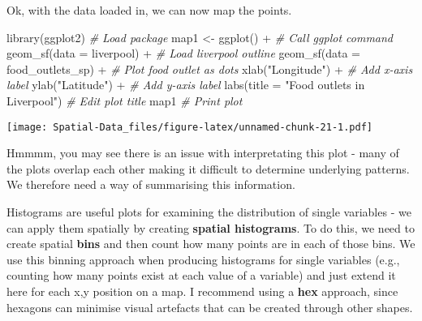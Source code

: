 \documentclass[
]{book}
\newenvironment{Shaded}{\begin{snugshade}}{\end{snugshade}}
\newcommand{\AttributeTok}[1]{\textcolor[rgb]{0.77,0.63,0.00}{#1}}
\newcommand{\CommentTok}[1]{\textcolor[rgb]{0.56,0.35,0.01}{\textit{#1}}}
\newcommand{\FunctionTok}[1]{\textcolor[rgb]{0.00,0.00,0.00}{#1}}
\newcommand{\NormalTok}[1]{#1}
\newcommand{\OtherTok}[1]{\textcolor[rgb]{0.56,0.35,0.01}{#1}}
\newcommand{\SpecialCharTok}[1]{\textcolor[rgb]{0.00,0.00,0.00}{#1}}
\newcommand{\StringTok}[1]{\textcolor[rgb]{0.31,0.60,0.02}{#1}}
\begin{document}
Ok, with the data loaded in, we can now map the points.

\begin{Shaded}
\begin{Highlighting}[]
\FunctionTok{library}\NormalTok{(ggplot2) }\CommentTok{\# Load package}
\NormalTok{map1 }\OtherTok{\textless{}{-}} \FunctionTok{ggplot}\NormalTok{() }\SpecialCharTok{+} \CommentTok{\# Call ggplot command}
  \FunctionTok{geom\_sf}\NormalTok{(}\AttributeTok{data =}\NormalTok{ liverpool) }\SpecialCharTok{+} \CommentTok{\# Load liverpool outline}
  \FunctionTok{geom\_sf}\NormalTok{(}\AttributeTok{data =}\NormalTok{ food\_outlets\_sp) }\SpecialCharTok{+} \CommentTok{\# Plot food outlet as dots}
  \FunctionTok{xlab}\NormalTok{(}\StringTok{"Longitude"}\NormalTok{) }\SpecialCharTok{+} \CommentTok{\# Add x{-}axis label}
  \FunctionTok{ylab}\NormalTok{(}\StringTok{"Latitude"}\NormalTok{) }\SpecialCharTok{+} \CommentTok{\# Add y{-}axis label}
  \FunctionTok{labs}\NormalTok{(}\AttributeTok{title =} \StringTok{"Food outlets in Liverpool"}\NormalTok{) }\CommentTok{\# Edit plot title}
\NormalTok{map1 }\CommentTok{\# Print plot}
\end{Highlighting}
\end{Shaded}

\texttt{[image: Spatial-Data\_files/figure-latex/unnamed-chunk-21-1.pdf]}

Hmmmm, you may see there is an issue with interpretating this plot - many of the plots overlap each other making it difficult to determine underlying patterns. We therefore need a way of summarising this information.

Histograms are useful plots for examining the distribution of single variables - we can apply them spatially by creating \textbf{spatial histograms}. To do this, we need to create spatial \textbf{bins} and then count how many points are in each of those bins. We use this binning approach when producing histograms for single variables (e.g., counting how many points exist at each value of a variable) and just extend it here for each x,y position on a map. I recommend using a \textbf{hex} approach, since hexagons can minimise visual artefacts that can be created through other shapes.
\end{document}
